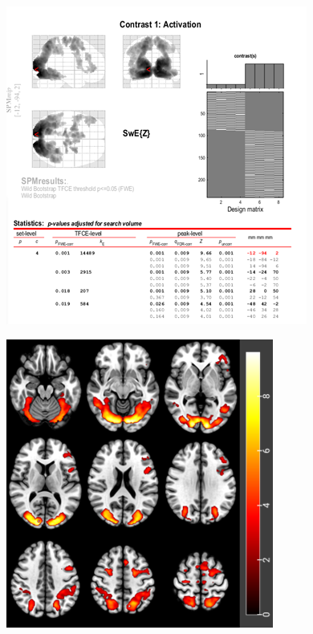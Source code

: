 \documentclass[a4paper,fleqn]{cas-sc}
\begin{document}
\begin{figure}[ht]
    \centering
    \begin{minipage}{0.48\textwidth}
        \centering
        \includegraphics[clip, trim=0 0 0 0, width=\linewidth]{figs/OAYA_spm.png} %
         \label{fig:a}
    \end{minipage}
    \begin{minipage}{0.48\textwidth}
        \centering
        \includegraphics[clip, trim=0 0 0 0, width=\linewidth]{figs/OAYA_slice.png} %

\end{minipage}
\end{figure}
\end{document}
